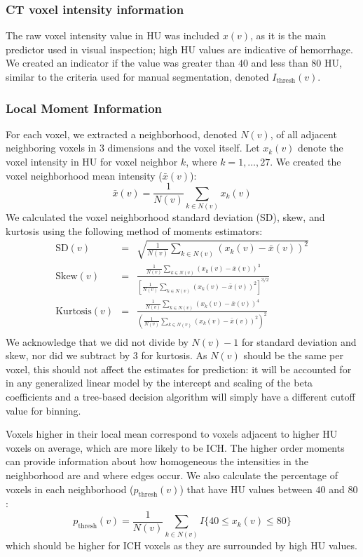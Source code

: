 \documentclass{elsarticle_nonatbib}\usepackage[]{graphicx}\usepackage[]{color}
\begin{document}
\subsubsection{CT voxel intensity information} The raw voxel intensity value in HU was included $x(v)$, as it is the main predictor used in visual inspection; high HU values are indicative of hemorrhage. We created an indicator if the value was greater than $40$ and less than $80$ HU, similar to the criteria used for manual segmentation, denoted $I_{\text{thresh}}(v)$. 

\subsubsection{Local Moment Information} For each voxel, we extracted a neighborhood, denoted $N(v)$, of all adjacent neighboring voxels in $3$ dimensions and the voxel itself.  Let $x_k(v)$ denote the voxel intensity in HU for voxel neighbor $k$, where $k = 1, \dots, 27$.  We created the voxel neighborhood mean intensity ($\bar{x}(v)$):
\begin{equation}
\bar{x}(v) = \frac{1}{N(v)} \sum_{k \in N(v)} x_k(v) \label{eq:mean}
\end{equation}
We calculated the voxel neighborhood standard deviation (SD), skew, and kurtosis using the following method of moments estimators:
\begin{eqnarray*}
\text{SD}(v) &=& \sqrt{ \frac{1}{N(v)} \sum_{k \in N(v)} \left(x_k(v) - \bar{x}(v)\right)^2 } \\
\text{Skew}(v) &=& \frac{ \frac{1}{N(v)} \sum\limits_{k \in N(v)} (x_k(v)-\bar{x}(v) )^3 } {\left[ \frac{1}{N(v)} \sum\limits_{k \in N(v)} (x_k(v)- \bar{x}(v))^2\right]^{3/2}} \\
\text{Kurtosis}(v) &=& \frac{ \frac{1}{N(v)} \sum\limits_{k \in N(v)} (x_k(v)-\bar{x}(v) )^4 }{ \left( \frac{1}{N(v)} \sum\limits_{k \in N(v)} \left(x_k(v) - \bar{x}(v)\right)^2\right)^2} \\
\label{eq:moment}
\end{eqnarray*}
We acknowledge that we did not divide by $N(v) - 1$ for standard deviation and skew, nor did we subtract by $3$ for kurtosis.  As $N(v)$ should be the same per voxel, this should not affect the estimates for prediction: it will be accounted for in any generalized linear model by the intercept and scaling of the beta coefficients and a tree-based decision algorithm will simply have a different cutoff value for binning.

Voxels higher in their local mean correspond to voxels adjacent to higher HU voxels on average, which are more likely to be ICH.  The higher order moments can provide information about how homogeneous the intensities in the neighborhood are and where edges occur.  We also calculate the percentage of voxels in each neighborhood ($p_{\text{thresh}}(v)$) that have HU values between $40$ and $80$:
\begin{equation}
p_{\text{thresh}}(v) = \frac{1}{N(v)} \sum_{k \in N(v)} I\{ 40 \leq x_k(v) \leq 80 \} \label{eq:pct}
\end{equation}
which should be higher for ICH voxels as they are surrounded by high HU values.  
\end{document}
